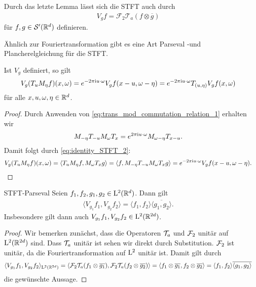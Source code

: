 Durch das letzte Lemma lässt sich die STFT auch durch
\begin{align}\label{eq:STFT_tensorprod}
V_g f = \mathcal{F}_2 \mathcal{T}_a (f \otimes \overline{g})
\end{align}
für $ f,g \in \mathcal{S}^\prime(\mathbb{R}^{d}) $ definieren.

Ähnlich zur Fouriertransformation gibt es eine Art Parseval -und Plancherelgleichung für die  STFT.


\begin{lem}\label{th:STFT_modulation_TF_argument}
	Ist $ V_g $ definiert, so gilt
	\begin{align}
	V_g  (T_u M_\eta f) ( x, \omega)
	= 
	e^{-2 \pi \textrm{i} u \cdot \omega}
	V_g f (x - u , \omega - \eta)
	=
	e^{-2 \pi \textrm{i} u \cdot \omega}
	T_{(u,\eta)} V_g f(x,\omega)
	\end{align}
	für alle $ x, u, \omega , \eta \in \mathbb{R}^d $.
\end{lem}

\begin{proof}
	Durch Anwenden von \eqref{eq:trans_mod_commutation_relation_1} erhalten wir
	\begin{align*}
	M_{- \eta} T_{-u} M_\omega T_x
	=
	e^{2\pi \textrm{i} u \cdot \omega} M_{\omega - \eta} T_{x - u }.
	\end{align*}
	Damit folgt durch \eqref{eq:identity_STFT_2}:
	\begin{align*}
	V_g (T_u M_\eta f)(x, \omega)
	= 
	\langle T_u M_\eta f , M_\omega T_x g \rangle
	=
	\langle f , M_{-\eta } T_{-u} M_\omega T_x g \rangle
	=
	e^{-2 \pi \textrm{i} u \cdot \omega}
	V_g f (x - u , \omega - \eta).
	\end{align*}
\end{proof}

\begin{genericthm}{STFT-Parseval}
	Seien $ f_1,f_2, g_1,g_2 \in \mathrm{L}^2(\mathbb{R}^d) $.
	Dann gilt 
	\begin{align}\label{orthogonality_relation}
	\langle V_{g_1} f_1, V_{g_2} f_2 \rangle =
	\langle f_1,f_2 \rangle  \overline{ \langle g_1, g_2 \rangle}.
	\end{align}
	Insbesondere gilt dann auch $ V_{g_1} f_1, V_{g_2} f_2 \in \mathrm{L}^2(\mathbb{R}^{2d}) $.
\end{genericthm}

\begin{proof}
	Wir bemerken zunächst, dass die Operatoren $ \mathcal{T}_a  $ und $ \mathcal{F}_2 $ unitär auf $ \mathrm{L}^2(\mathbb{R}^{2d}) $ sind. 
	Dass $ \mathcal{T}_a  $ unitär ist sehen wir direkt durch Substitution. $ \mathcal{F}_2 $ ist unitär, da die Fouriertransformation auf $ \mathrm{L}^2 $ unitär ist. 
	Damit gilt durch 
	\begin{align*}
	\langle V_{g_1} f_1 , V_{g_2} f_2 \rangle_{\mathrm{L}^2(\mathbb{R}^{2d})}
	= 
	\langle \mathcal{F}_2 \mathcal{T}_a (f_1 \otimes \overline{g_1}),
	\mathcal{F}_2 \mathcal{T}_a (f_2 \otimes \overline{g_2})
	\rangle
	=
	\langle
	f_1 \otimes \overline{g_1}, f_2 \otimes \overline{g_2}
	\rangle
	=
	\langle f_1,f_2 \rangle \overline{ \langle g_1, g_2 \rangle}
	\end{align*}
	die gewünschte Aussage.
\end{proof}

